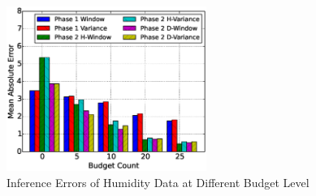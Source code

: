 \documentclass[12pt]{article}  %
\theoremstyle{definition}
\theoremstyle{remark}
\begin{document}
\begin{figure}[h]
\centering
        \includegraphics[width=0.58\textwidth]{../phase2/humidity_err}
\caption{Inference Errors of Humidity Data at Different Budget Level}
\label{fig:phase1:humidity}
\end{figure}




%
%
%

% 
%


%

\end{document}

